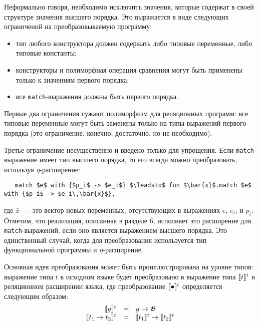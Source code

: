 Неформально говоря, необходимо исключить значения, которые содержат в своей структуре значения высшего порядка. 
Это выражается в виде следующих ограничений на преобразовываемую программу:

\begin{itemize}
  \item тип любого конструктора должен содержать либо типовые переменные, либо типовые константы;
  \item конструкторы и полиморфная операция сравнения могут быть применены только к значениям первого порядка;
  \item все \lstinline|match|-выражения должны быть первого порядка.
\end{itemize}


Первые два ограничения сужают полиморфизм для реляционных программ: все типовые переменные могут быть заменены только на типы выражений первого порядка (это ограничение, конечно, достаточно, но не необходимо).

Третье ограничение несущественно и введено только для упрощения. Если \lstinline|match|-выражение имеет тип высшего порядка, то его всегда можно преобразовать, используя $\eta$-расширение:

\begin{lstlisting}
   match $e$ with {$p_i$ -> $e_i$} $\leadsto$ fun $\bar{x}$.match $e$ with {$p_i$ -> $e_i\,\bar{x}$},
\end{lstlisting}

\noindent где $\bar{x}$~--- это вектор новых переменных, отсутствующих в выражениях $e$, $e_i$, и $p_i$. Отметим, что реализация, описанная в разделе 6, исполняет это расширение для \lstinline|match|-выражений, если оно является выражением высшего порядка. Это единственный случай, когда для преобразования используется тип функциональной программы и $\eta$-расширение.

Основная идея преобразования может быть проиллюстрирована на уровне типов: выражение типа $t$ в исходном языке будет преобразовано в выражение типа $\llbracket{t}\rrbracket^t$ в реляционном расширении языка, где преобразование $\llbracket{\bullet}\rrbracket^t$ определяется следующим образом:
$$
\begin{array}{rcl}
\llbracket{g}\rrbracket^t                     & = & g \to \mathfrak G \\
\llbracket{t_1 \to t_2}\rrbracket^t           & = & \llbracket{t_1}\rrbracket^t \to \llbracket{t_2}\rrbracket^t \\
\end{array}
$$

